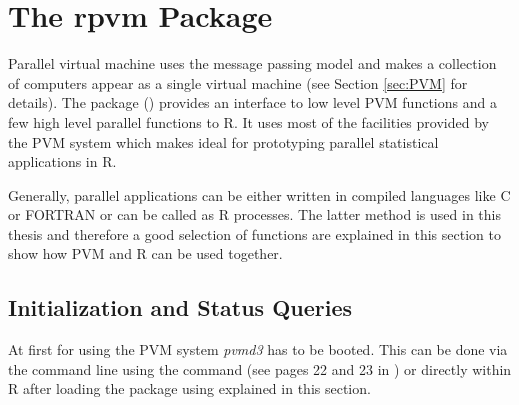 \section{The rpvm Package}
\label{sec:rpvm}
Parallel virtual machine uses the message passing model and makes a
collection of computers appear as a single virtual machine (see Section
\ref{sec:PVM} for details).
The package  (\cite{nali07rpvm}) provides an interface to
low level PVM functions and
a few high level parallel functions to R. It uses most of the
facilities provided by the PVM system which makes  ideal for
prototyping parallel statistical applications in R.

Generally, parallel applications can be either written in compiled
languages like C or 
FORTRAN or can be called as R processes. The latter method is used in
this thesis and therefore a good selection of 
functions are explained in this section to show how PVM and R can be
used together. 


\subsection{Initialization and Status Queries}

At first for using the PVM system \textit{pvmd3} has to be
booted. This can be done via the command line using the 
command (see pages 22 and 23 in \cite{geist94pvm}) or directly within
R after loading the  package using 
explained in this section.

